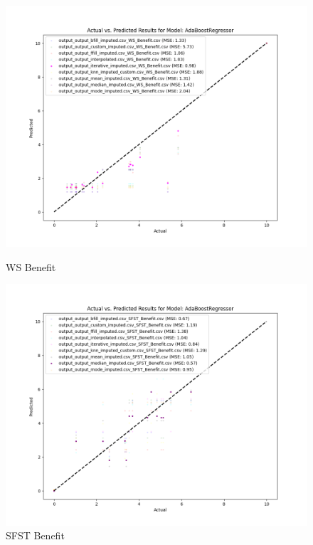 \begin{figure}[H]
    \centering
    \begin{minipage}{0.495\textwidth}
        \centering
        \includegraphics[width=\linewidth]{reg_section_all/images_reg_training/WS_Benefit_AdaBoostRegressor_plot.png}
        \caption{WS Benefit}
        \label{fig:ws_ben_reg_training}
    \end{minipage}\hfill
    \begin{minipage}{0.495\textwidth}
        \centering
        \includegraphics[width=\linewidth]{reg_section_all/images_reg_training/SFST_Benefit_AdaBoostRegressor_plot.png}
        \caption{SFST Benefit}
        \label{fig:sfst_ben_reg_training}
    \end{minipage}
\end{figure}